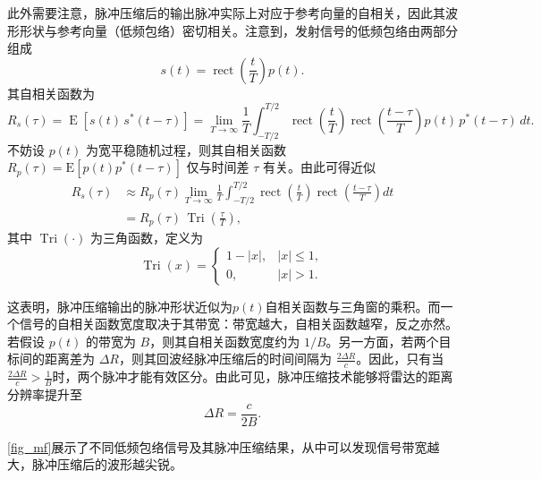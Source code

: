 此外需要注意，脉冲压缩后的输出脉冲实际上对应于参考向量的自相关，因此其波形形状与参考向量（低频包络）密切相关。注意到，发射信号的低频包络由两部分组成
\[
    s(t) = \operatorname{rect}\left( \frac{t}{T} \right) p(t).
\]
其自相关函数为
\[
    R_s(\tau) = \operatorname{E}\left[ s(t)\,s^*(t-\tau)\right]
    = \lim_{T \rightarrow \infty } \frac{1}{T} \int_{-T/2}^{T/2} \operatorname{rect}\left( \frac{t}{T} \right)
    \operatorname{rect}\left( \frac{t-\tau}{T} \right)
    p(t)\,p^*(t-\tau)\,dt.
\]
不妨设 \(p(t)\) 为宽平稳随机过程，则其自相关函数\( R_p(\tau) = \mathrm{E}[p(t)p^*(t-\tau)] \) 仅与时间差 \(\tau\) 有关。由此可得近似
\[
    \begin{split}
        R_s(\tau) & \approx R_p(\tau)
        \lim_{T \rightarrow \infty } \frac{1}{T} \int_{-T/2}^{T/2}
        \operatorname{rect}\left( \frac{t}{T} \right)
        \operatorname{rect}\left( \frac{t-\tau}{T} \right) dt                      \\
                  & = R_p(\tau)\, \operatorname{Tri}\left( \frac{\tau}{T} \right),
    \end{split}
\]
其中 \(\operatorname{Tri}(\cdot)\) 为三角函数，定义为
\[
    \operatorname{Tri}(x) =
    \begin{cases}
        1-|x|, & |x|\leq 1, \\
        0,     & |x|>1.
    \end{cases}
\]

这表明，脉冲压缩输出的脉冲形状近似为\( p(t) \)自相关函数与三角窗的乘积。而一个信号的自相关函数宽度取决于其带宽：带宽越大，自相关函数越窄，反之亦然。若假设 \(p(t)\) 的带宽为 \(B\)，则其自相关函数宽度约为 \(1/B\)。另一方面，若两个目标间的距离差为 \(\Delta R\)，则其回波经脉冲压缩后的时间间隔为 \(\tfrac{2\Delta R}{c}\)。因此，只有当\(\frac{2\Delta R}{c} > \frac{1}{B}\)时，两个脉冲才能有效区分。由此可见，脉冲压缩技术能够将雷达的距离分辨率提升至
\[
    \Delta R = \frac{c}{2B}.
\]

\cref{fig_mf}展示了不同低频包络信号及其脉冲压缩结果，从中可以发现信号带宽越大，脉冲压缩后的波形越尖锐。

